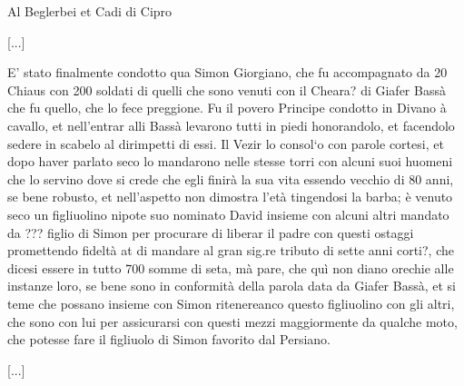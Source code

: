 

\begin{center}
Al Beglerbei et Cadi di Cipro
\end{center}



\setcounter{docnumber}{3}


[...]

E' stato finalmente condotto  qua Simon Giorgiano, che fu accompagnato
da 20 Chiaus con 200 soldati  di quelli che sono venuti con il Cheara?
di Giafer  Bassà che fu  quello, che lo  fece preggione. Fu  il povero
Principe  condotto in  Divano  à cavallo,  et  nell'entrar alli  Bassà
levarono tutti in piedi honorandolo, et facendolo sedere in scabelo al
dirimpetti di essi.  Il Vezir lo consol`o con  parole cortesi, et dopo
haver parlato  seco lo  mandarono nelle stesse  torri con  alcuni suoi
huomeni  che lo  servino dove  si crede  che egli  finirà la  sua vita
essendo  vecchio di  80 anni,  se  bene robusto,  et nell'aspetto  non
dimostra  l'età tingendosi  la  barba; è  venuto  seco un  figliuolino
nipote  suo nominato  David insieme  con alcuni  altri mandato  da ???
figlio di Simon  per procurare di liberar il  padre con questi ostaggi
promettendo fideltà at di mandare al gran sig.re tributo di sette anni
corti?, che dicesi essere in tutto 700 somme di seta, mà pare, che quì
non diano orechie alle instanze loro, se bene sono in conformità della
parola data da Giafer Bassà, et  si teme che possano insieme con Simon
ritenereanco questo  figliuolino con gli  altri, che sono con  lui per
assicurarsi con questi mezzi maggiormente da qualche moto, che potesse
fare il figliuolo di Simon favorito dal Persiano.

[...]

